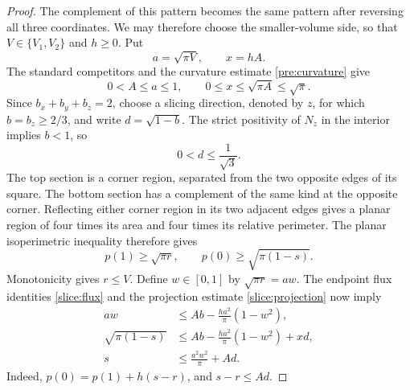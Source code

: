 \begin{proof}
The complement of this pattern becomes the same pattern after reversing
all three coordinates.  We may therefore choose the smaller-volume side,
so that $V\in\{V_1,V_2\}$ and $h\ge0$.  Put
\[
 a=\sqrt{\pi V},\qquad x=hA.
\]
The standard competitors and the curvature estimate
\eqref{pre:curvature} give
\begin{equation}\label{slice:four-parameters}
 0<A\le a\le1,\qquad
 0\le x\le\sqrt{\pi A}\le\sqrt\pi.
\end{equation}
Since $b_x+b_y+b_z=2$, choose a slicing direction, denoted by $z$,
for which $b=b_z\ge2/3$, and write $d=\sqrt{1-b}$.
The strict positivity of $N_z$ in the interior implies $b<1$, so
\[
 0<d\le\frac1{\sqrt3}.
\]
The top section is a corner region, separated from the two opposite
edges of its square.  The bottom section has a complement of the same
kind at the opposite corner.  Reflecting either corner region in its
two adjacent edges gives a planar region of four times its area and
four times its relative perimeter.  The planar isoperimetric inequality
therefore gives
\[
 p(1)\ge\sqrt{\pi r},\qquad
 p(0)\ge\sqrt{\pi(1-s)}.
\]
Monotonicity gives $r\le V$.  Define $w\in[0,1]$ by
$\sqrt{\pi r}=aw$.  The endpoint flux identities
\eqref{slice:flux} and the projection estimate
\eqref{slice:projection} now imply
\begin{equation}\label{slice:four-endpoint-inequalities}
\begin{aligned}
 aw&\le Ab-\frac{ha^2}{\pi}(1-w^2),\\
 \sqrt{\pi(1-s)}
 &\le Ab-\frac{ha^2}{\pi}(1-w^2)+xd,\\
 s&\le\frac{a^2w^2}{\pi}+Ad.
\end{aligned}
\end{equation}
Indeed, $p(0)=p(1)+h(s-r)$, and $s-r\le Ad$.


\end{proof}
